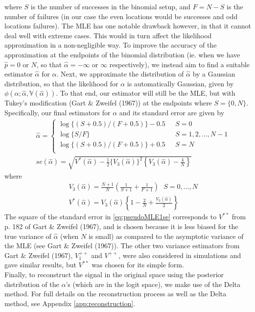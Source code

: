 \documentclass[12pt]{article}
\newcommand{\Ga}{\alpha}
\begin{document}
where $S$ is the number of successes in the binomial setup, and $F=N-S$ is the number of failures (in our case the even locations would be successes and odd locations failures). The MLE has one notable drawback however, in that it cannot deal well with extreme cases. This would in turn affect the likelihood approximation in a non-negligible way. To improve the accuracy of the approximation at the endpoints of the binomial distribution (ie. when we have $\hat{p}=0$ or $N$, so that $\hat{\Ga}=-\infty$ or $\infty$ respectively), we instead aim to find a suitable estimator $\hat{\Ga}$ for $\Ga$. Next, we approximate the distribution of $\hat{\Ga}$ by a Gaussian distribution, so that the likelihood for $\Ga$ is automatically Gaussian, given by $\phi(\Ga;\hat{\Ga},\mathbb{V}(\hat{\Ga}))$. To that end, our estimator will still be the MLE, but with Tukey's modification (Gart \& Zweifel (1967)) at the endpoints where $S=\{0,N\}$. Specifically, our final estimators for $\Ga$ and its standard error are given by
\begin{eqnarray}\label{eq:pseudoMLE1}
&&\hat{\Ga}=\left\{
\begin{array}{lll}
\log\{(S+0.5)/(F+0.5)\}-0.5&\ \ \ S=0\\
\log\{S/F\}&\ \ \ S=1,2,...,N-1\\
\log\{(S+0.5)/(F+0.5)\}+0.5&\ \ \ S=N\\
\end{array}
\right.\\ \label{eq:pseudoMLE1se}
&&se(\hat{\Ga})=\sqrt{V^*(\hat{\Ga})-\frac{1}{2}\{V_3(\hat{\Ga})\}^2\left\{V_3(\hat{\Ga})-\frac{4}{N}\right\}}
\end{eqnarray}
where
\begin{eqnarray}
&&V_3(\hat{\Ga})=\frac{N+1}{N}\left(\frac{1}{S+1}+\frac{1}{F+1}\right)\ \ \ S=0,...,N\\
\label{eq:pseudoMLE2}&&V^*(\hat{\Ga})=V_3(\hat{\Ga})\left\{1-\frac{2}{N}+\frac{V_3(\hat{\Ga})}{2}\right\}
\end{eqnarray}
The square of the standard error in \eqref{eq:pseudoMLE1se} corresponds to $V^{\ast\ast}$ from p. 182 of Gart \& Zweifel (1967), and is chosen because it is less biased for the true variance of $\hat{\Ga}$ (when $N$ is small) as compared to the asymptotic variance of the MLE (see Gart \& Zweifel (1967)). The other two variance estimators from Gart \& Zweifel (1967), $V_1^{++}$ and $V^{++}$, were also considered in simulations and gave similar results, but $V^{\ast\ast}$ was chosen for its simple form.\bigskip\\
Finally, to reconstruct the signal in the original space using the posterior distribution of the $\Ga$'s (which are in the logit space), we make use of the Delta method. For full details on the reconstruction process as well as the Delta method, see Appendix \ref{app:reconstruction}.
\end{document}
